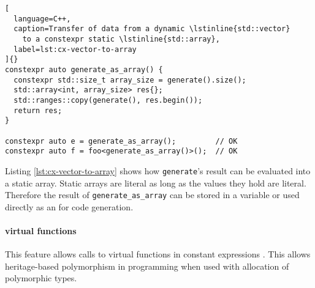 \documentclass[../../main]{subfiles}
\begin{document}
\begin{lstlisting}[
  language=C++,
  caption=Transfer of data from a dynamic \lstinline{std::vector}
    to a constexpr static \lstinline{std::array},
  label=lst:cx-vector-to-array
]{}
constexpr auto generate_as_array() {
  constexpr std::size_t array_size = generate().size();
  std::array<int, array_size> res{};
  std::ranges::copy(generate(), res.begin());
  return res;
}

constexpr auto e = generate_as_array();         // OK
constexpr auto f = foo<generate_as_array()>();  // OK
\end{lstlisting}

Listing \ref{lst:cx-vector-to-array} shows how \lstinline{generate}'s result
can be evaluated into a static array. Static arrays are literal as long
as the values they hold are literal. Therefore the result of
\lstinline{generate_as_array} can be stored in a \constexpr variable or used
directly as an \nttp for code generation.

\paragraph{
  \constexpr virtual functions
}

This feature allows calls to virtual functions in constant expressions
\cite{virtual-constexpr}. This allows heritage-based polymorphism in \constexpr
programming when used with \constexpr allocation of polymorphic types.

%
%

\end{document}
